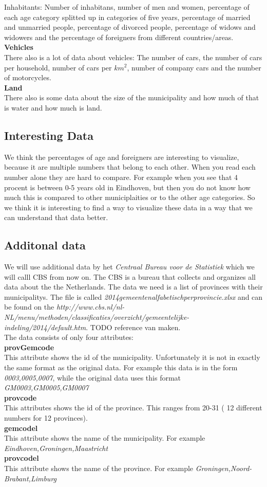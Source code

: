 Inhabitants: Number of inhabitans, number of men and women, percentage of each age category splitted up in categories of five years, percentage of married and unmarried people, percentage of divorced people, percentage of widows and widowers and the percentage of foreigners from different countries/areas. \\
 \textbf{Vehicles} \\
 There also is a lot of data about vehicles: The number of cars, the number of cars per household, number of cars per $km^{2}$, number of company cars and the number of motorcycles. \\
  \textbf{Land} \\
There also is some data about the size of the municipality and how much of that is water and how much is land. \\
\subsection{Interesting Data}
We think the percentages of age and foreigners are interesting to visualize, because it are multiple numbers that belong to each other. When you read each number alone they are hard to compare. For example when you see that 4 procent is between 0-5 years old in Eindhoven, but then you do not know how much this is compared to other municiplaities or to the other age categories. So we think it is interesting to find a way to visualize these data in a way that we can understand that data better. 
\subsection{Additonal data}
We will use additional data by het \emph{Centraal Bureau voor de Statistiek} which we will calll CBS from now on. The CBS is a bureau that collects and organizes all data about the the Netherlands. The data we need is a list of provinces with their municipalitys. The file is called \emph{2014gemeentenalfabetischperprovincie.xlsx} and can be found on the  \emph{ http://www.cbs.nl/nl-NL/menu/methoden/classificaties/overzicht/gemeentelijke-indeling/2014/default.htm}. TODO reference van maken. \\
The data consists of only four attributes:\\
\textbf{provGemcode} \\
This attribute shows the id of the municipality. Unfortunately it is not in exactly the same format as the original data. For example this data is in the form \emph{0003,0005,0007}, while the original data uses this format \emph{GM0003,GM0005,GM0007}\\
\textbf{provcode} \\
This attributes shows the id of the province. This ranges from 20-31 ( 12 different numbers for 12 provinces).\\
\textbf{gemcodel} \\
This attribute shows the name of the municipality. For example \emph{Eindhoven,Groningen,Maastricht} \\
\textbf{provcodel} \\
This attribute shows the name of the province. For example \emph{Groningen,Noord-Brabant,Limburg} \\
